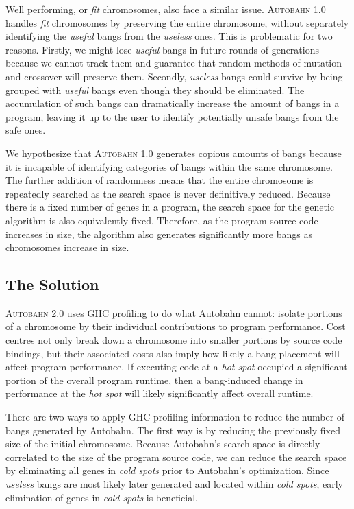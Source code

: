 \documentclass[format=sigplan]{acmart}
\newcommand{\hotspot}[0]{\textit{hot spot}}
\newcommand{\coldspots}[0]{\textit{cold spots}}
\newcommand{\useful}[0]{\textit{useful}}
\newcommand{\useless}[0]{\textit{useless}}
\newcommand{\Ao}[0]{\textsc{Autobahn 1.0}}
\newcommand{\At}[0]{\textsc{Autobahn 2.0}}
\newcommand{\fit}[0]{\textit{fit}}
\begin{document}
Well performing, or \fit{} chromosomes, also face a similar issue. \Ao{} handles \fit{} chromosomes by preserving the entire chromosome, without separately identifying the \useful{} bangs from the \useless{} ones. This is problematic for two reasons. Firstly, we might lose \useful{} bangs in future rounds of generations because we cannot track them and guarantee that random methods of mutation and crossover will preserve them. Secondly, \useless{} bangs could survive by being grouped with \useful{} bangs even though they should be eliminated. The accumulation of such bangs can dramatically increase the amount of bangs in a program, leaving it up to the user to identify potentially unsafe bangs from the safe ones. 

We hypothesize that \Ao{} generates copious amounts of bangs because it is incapable of identifying categories of bangs within the same chromosome. The further addition of randomness means that the entire chromosome is repeatedly searched as the search space is never definitively reduced. Because there is a fixed number of genes in a program, the search space for the genetic algorithm is also equivalently fixed. Therefore, as the program source code increases in size, the algorithm also generates significantly more bangs as chromosomes increase in size. 

\subsection{The Solution}

\At{} uses GHC profiling to do what Autobahn cannot: isolate portions of a chromosome by their individual contributions to program performance. Cost centres not only break down a chromosome into smaller portions by source code bindings, but their associated costs also imply how likely a bang placement will affect program performance. If executing code at a \hotspot{} occupied a significant portion of the overall program runtime, then a bang-induced change in performance at the \hotspot{} will likely significantly affect overall runtime. 

There are two ways to apply GHC profiling information to reduce the number of bangs generated by Autobahn. The first way is by reducing the previously fixed size of the initial chromosome. Because Autobahn's search space is directly correlated to the size of the program source code, we can reduce the search space by eliminating all genes in \coldspots{} prior to Autobahn's optimization. Since \useless{} bangs are most likely later generated and located within \coldspots{}, early elimination of genes in \coldspots{} is beneficial. 
\end{document}
